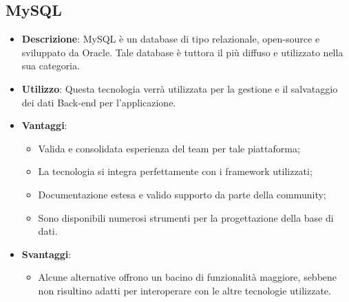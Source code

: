 \subsection{MySQL}
\begin{itemize}
	\item \textbf{Descrizione}: MySQL è un database di tipo relazionale, open-source e sviluppato da Oracle. Tale database è tuttora il più diffuso e utilizzato nella sua categoria.
	\item \textbf{Utilizzo}: Questa tecnologia verrà utilizzata per la gestione e il salvataggio dei dati Back-end per l'applicazione.
	\item \textbf{Vantaggi}:
	\begin{itemize}
		\item Valida e consolidata esperienza del team per tale piattaforma;
		\item La tecnologia si integra perfettamente con i framework utilizzati;
		\item Documentazione estesa e valido supporto da parte della community;
		\item Sono disponibili numerosi strumenti per la progettazione della base di dati.
	\end{itemize}
	\item \textbf{Svantaggi}:
	\begin{itemize}
		\item Alcune alternative offrono un bacino di funzionalità maggiore, sebbene non risultino adatti per interoperare con le altre tecnologie utilizzate.
	\end{itemize}
\end{itemize}



